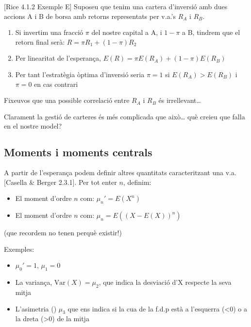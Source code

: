\documentclass[letterpaper,10pt,english]{sphinxmanual}
\begin{document}
{[}Rice 4.1.2 Exemple E{]} Suposeu que tenim una cartera d’inversió amb dues accions A i B de borsa
amb retorns representats per v.a.’s \(R_A\) i \(R_B\).
\begin{enumerate}
%
\item {} 
Si invertim una fracció \(\pi\) del nostre capital a A, i \(1-\pi\) a B, tindrem que el retorn final serà: \(R = \pi R_1 + \left(1 - \pi\right)R_2\)

\item {} 
Per linearitat de l’esperança, \(E(R) = \pi E(R_A) + \left(1 - \pi\right)E(R_B)\)

\item {} 
Per tant l’estratègia òptima d’inversió seria \(\pi=1\) si \(E(R_A)>E(R_B)\) i \(\pi=0\) en cas contrari

\end{enumerate}

Fixeu\sphinxhyphen{}vos que una possible correlació entre \(R_A\) i \(R_B\) és irrellevant…

Clarament la gestió de carteres és més complicada que això… què creieu que falla en el nostre model?


\subsection{Moments i moments centrals}
\label{\detokenize{0_Intro/0_1_Repas_probabilitat:moments-i-moments-centrals}}
A partir de l’esperança podem definir altres quantitats caracteritzant
una v.a. {[}Casella \& Berger 2.3.1{]}. Per tot enter \(n\), definim:
\begin{itemize}
\item {} 
El moment d’ordre \(n\) com: \(\mu_n' = E(X^n)\)

\item {} 
El moment  d’ordre \(n\) com: \(\mu_n = E\left(\left(X - E(X)\right)^n\right)\)

\end{itemize}

(que recordem no tenen perquè existir!)

Exemples:
\begin{itemize}
\item {} 
\(\mu_0'=1\), \(\mu_1=0\)

\item {} 
La variança, \(\mbox{Var}\left(X\right) = \mu_2\), que indica la desviació d’X respecte la seva mitja

\item {} 
L’asimetria () \(\mu_3\) que ens indica si la cua de la f.d.p està a l’esquerra (\textless{}0) o a la dreta (\textgreater{}0) de la mitja

\end{itemize}
\end{document}
